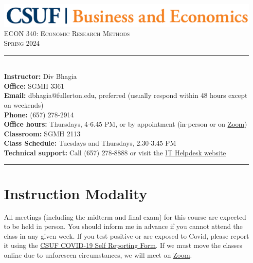 \documentclass{syllabus}
\begin{document}
\begin{center}
\includegraphics[scale=0.22]{CBE-Wordmark-CMYK} \\ \vspace{0.5em}
{\large \textsc{ECON 340: Economic Research Methods}} \\
{\large \textsc{Spring 2024}}
\end{center}

\begin{center}
\begin{minipage}[t]{\textwidth}
\rule{\textwidth}{0.5pt} \\
\textbf{Instructor:} Div Bhagia \\
\textbf{Office:} SGMH 3361 \\
\textbf{Email:} dbhagia@fullerton.edu, preferred (usually respond within 48 hours except on weekends) \\
\textbf{Phone:} (657) 278-2914 \\
\textbf{Office hours:} Thursdays, 4-6.45 PM, or by appointment (in-person or on \href{https://fullerton.zoom.us/j/81895171931}{Zoom}) \\
\textbf{Classroom:} SGMH 2113 \\
\textbf{Class Schedule:} Tuesdays and Thursdays, 2.30-3.45 PM \\
\textbf{Technical support:} Call (657) 278-8888 or visit the \href{https://www.fullerton.edu/it/students/helpdesk/index.php}{IT Helpdesk website} \\
\rule{\textwidth}{0.5pt} 
\end{minipage}
\end{center}

\vspace{0.35cm}
\section*{Instruction Modality}
All meetings (including the midterm and final exam) for this course are expected to be held in person. You should inform me in advance if you cannot attend the class in any given week. If you test positive or are exposed to Covid, please report it using the \href{https://coronavirus.fullerton.edu/report-covid-19-case-or-exposure/}{CSUF COVID-19 Self Reporting Form}. If we must move the classes online due to unforeseen circumstances, we will meet on \href{https://fullerton.zoom.us/j/81895171931}{Zoom}.
\end{document}
